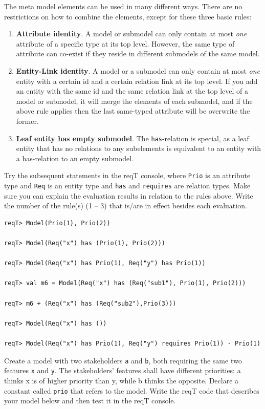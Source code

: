 \documentclass[11pt]{article}
\begin{document}
The meta model elements can be used in many different ways. There are no restrictions on how to combine the elements, except for these three basic rules:
\begin{enumerate}[nolistsep]
\item {\bf Attribute identity}. A model or submodel can only contain at most {\it one} attribute of a specific type at its top level. However, the same type of attribute can co-exist if they reside in different submodels of the same model. 
\item {\bf Entity-Link identity}. A model or a submodel can only contain at most {\it one} entity with a certain id and a certain relation link at its top level. If you add an entity with the same id and the same relation link at the top level of a model or submodel, it will merge the elements of each submodel, and if the above rule applies then the last same-typed attribute will be overwrite the former. 
\item {\bf Leaf entity has empty submodel}. The \verb+has+-relation is special, as a leaf entity that has no relations to any subelements is equivalent to an entity with a has-relation to an empty submodel. 
\end{enumerate}

\begin{framed}\noindent
Try the subsequent statements in the reqT console, where \verb+Prio+ is an attribute type and \verb+Req+ is an entity type and \verb+has+ and \verb+requires+ are relation types. Make sure you can explain the evaluation results in relation to the rules above. Write the number of the rule(s) (1 -- 3) that is/are in effect besides each evaluation. 

{\scriptsize \begin{verbatim}
reqT> Model(Prio(1), Prio(2))

reqT> Model(Req("x") has (Prio(1), Prio(2)))

reqT> Model(Req("x") has Prio(1), Req("y") has Prio(1))

reqT> val m6 = Model(Req("x") has (Req("sub1"), Prio(1), Prio(2))) 

reqT> m6 + (Req("x") has (Req("sub2"),Prio(3)))

reqT> Model(Req("x") has ())

reqT> Model(Req("x") has Prio(1), Req("y") requires Prio(1)) - Prio(1)
\end{verbatim}}
\end{framed}

\begin{framed}\noindent
Create a model with two stakeholders \verb+a+ and \verb+b+, both requiring the same two features \verb+x+ and \verb+y+. The stakeholders' features shall have different priorities: a thinks x is of higher priority than y, while b thinks the opposite. Declare a constant called \verb+prio+ that refers to the model. Write the reqT code that describes your model below and then test it in the reqT console.
\newline
\newline 
\vspace{3cm}

\end{framed}
\end{document}
